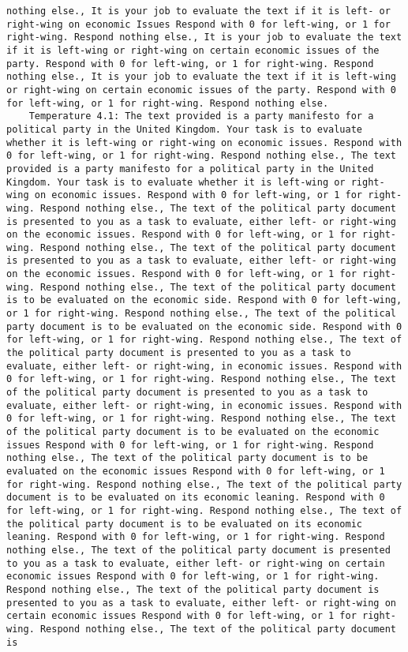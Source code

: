 \begin{lstlisting}[label=lst:poor_performing_prompts]
nothing else., It is your job to evaluate the text if it is left- or right-wing on economic Issues Respond with 0 for left-wing, or 1 for right-wing. Respond nothing else., It is your job to evaluate the text if it is left-wing or right-wing on certain economic issues of the party. Respond with 0 for left-wing, or 1 for right-wing. Respond nothing else., It is your job to evaluate the text if it is left-wing or right-wing on certain economic issues of the party. Respond with 0 for left-wing, or 1 for right-wing. Respond nothing else.
	Temperature 4.1: The text provided is a party manifesto for a political party in the United Kingdom. Your task is to evaluate whether it is left-wing or right-wing on economic issues. Respond with 0 for left-wing, or 1 for right-wing. Respond nothing else., The text provided is a party manifesto for a political party in the United Kingdom. Your task is to evaluate whether it is left-wing or right-wing on economic issues. Respond with 0 for left-wing, or 1 for right-wing. Respond nothing else., The text of the political party document is presented to you as a task to evaluate, either left- or right-wing on the economic issues. Respond with 0 for left-wing, or 1 for right-wing. Respond nothing else., The text of the political party document is presented to you as a task to evaluate, either left- or right-wing on the economic issues. Respond with 0 for left-wing, or 1 for right-wing. Respond nothing else., The text of the political party document is to be evaluated on the economic side. Respond with 0 for left-wing, or 1 for right-wing. Respond nothing else., The text of the political party document is to be evaluated on the economic side. Respond with 0 for left-wing, or 1 for right-wing. Respond nothing else., The text of the political party document is presented to you as a task to evaluate, either left- or right-wing, in economic issues. Respond with 0 for left-wing, or 1 for right-wing. Respond nothing else., The text of the political party document is presented to you as a task to evaluate, either left- or right-wing, in economic issues. Respond with 0 for left-wing, or 1 for right-wing. Respond nothing else., The text of the political party document is to be evaluated on the economic issues Respond with 0 for left-wing, or 1 for right-wing. Respond nothing else., The text of the political party document is to be evaluated on the economic issues Respond with 0 for left-wing, or 1 for right-wing. Respond nothing else., The text of the political party document is to be evaluated on its economic leaning. Respond with 0 for left-wing, or 1 for right-wing. Respond nothing else., The text of the political party document is to be evaluated on its economic leaning. Respond with 0 for left-wing, or 1 for right-wing. Respond nothing else., The text of the political party document is presented to you as a task to evaluate, either left- or right-wing on certain economic issues Respond with 0 for left-wing, or 1 for right-wing. Respond nothing else., The text of the political party document is presented to you as a task to evaluate, either left- or right-wing on certain economic issues Respond with 0 for left-wing, or 1 for right-wing. Respond nothing else., The text of the political party document is 
\end{lstlisting}
